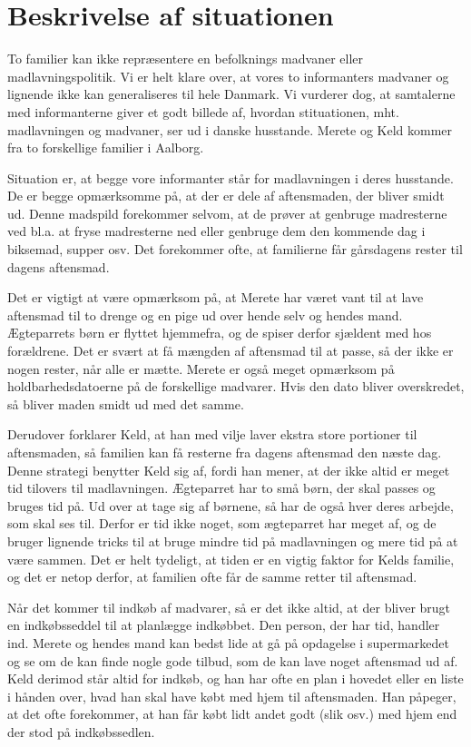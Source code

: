 \section{Beskrivelse af situationen}
\label{sec:situation}

To familier kan ikke repræsentere en befolknings madvaner eller madlavningspolitik. Vi er helt klare over, at vores to informanters madvaner og lignende ikke kan generaliseres til hele Danmark. Vi vurderer dog, at samtalerne med informanterne giver et godt billede af, hvordan stituationen, mht. madlavningen og madvaner, ser ud i danske husstande. Merete og Keld kommer fra to forskellige familier i Aalborg.

Situation er, at begge vore informanter står for madlavningen i deres husstande. De er begge opmærksomme på, at der er dele af aftensmaden, der bliver smidt ud. Denne madspild forekommer selvom, at de prøver at genbruge madresterne ved bl.a. at fryse madresterne ned eller genbruge dem den kommende dag i \fx biksemad, supper osv. Det forekommer ofte, at familierne får gårsdagens rester til dagens aftensmad.

Det er vigtigt at være opmærksom på, at Merete har været vant til at lave aftensmad til to drenge og en pige ud over hende selv og hendes mand. Ægteparrets børn er flyttet hjemmefra, og de spiser derfor sjældent med hos forældrene. Det er svært at få mængden af aftensmad til at passe, så der ikke er nogen rester, når alle er mætte. Merete er også meget opmærksom på holdbarhedsdatoerne på de forskellige madvarer. Hvis den dato bliver overskredet, så bliver maden smidt ud med det samme.

Derudover forklarer Keld, at han med vilje laver ekstra store portioner til aftensmaden, så familien kan få resterne fra dagens aftensmad den næste dag. Denne strategi benytter Keld sig af, fordi han mener, at der ikke altid er meget tid tilovers til madlavningen. Ægteparret har to små børn, der skal passes og bruges tid på. Ud over at tage sig af børnene, så har de også hver deres arbejde, som skal ses til. Derfor er tid ikke noget, som ægteparret har meget af, og de bruger lignende tricks til at bruge mindre tid på madlavningen og mere tid på at være sammen. Det er helt tydeligt, at tiden er en vigtig faktor for Kelds familie, og det er netop derfor, at familien ofte får de samme retter til aftensmad.

Når det kommer til indkøb af madvarer, så er det ikke altid, at der bliver brugt en indkøbsseddel til at planlægge indkøbbet. Den person, der har tid, handler ind. Merete og hendes mand kan bedst lide at gå på opdagelse i supermarkedet og se om de kan finde nogle gode tilbud, som de kan lave noget aftensmad ud af. Keld derimod står altid for indkøb, og han har ofte en plan i hovedet eller en liste i hånden over, hvad han skal have købt med hjem til aftensmaden. Han påpeger, at det ofte forekommer, at han får købt lidt andet godt (slik osv.) med hjem end der stod på indkøbssedlen.

